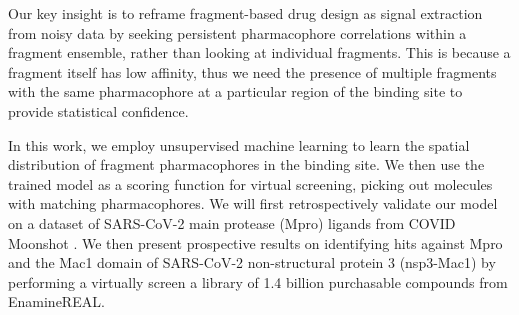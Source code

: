 Our key insight is to reframe fragment-based drug design as signal extraction from noisy data by seeking persistent pharmacophore correlations within a fragment ensemble, rather than looking at individual fragments. This is because a fragment itself has low affinity, thus we need the presence of multiple fragments with the same pharmacophore at a particular region of the binding site to provide statistical confidence. 

In this work, we employ unsupervised machine learning to learn the spatial distribution of fragment pharmacophores in the binding site. We then use the trained model as a scoring function for virtual screening, picking out molecules with matching pharmacophores. We will first retrospectively validate our model on a dataset of SARS-CoV-2 main protease (Mpro) ligands from COVID Moonshot \cite{Moonshot2022}. We then present prospective results on identifying hits against Mpro and the Mac1 domain of SARS-CoV-2 non-structural protein 3 (nsp3-Mac1) by performing a virtually screen a library of 1.4 billion purchasable compounds from EnamineREAL.



